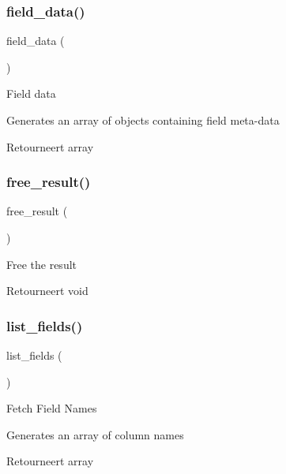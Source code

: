 \subsubsection{\texorpdfstring{field\_data()}{field\_data()}}
{\footnotesize\ttfamily field\+\_\+data (\begin{DoxyParamCaption}{ }\end{DoxyParamCaption})}

Field data

Generates an array of objects containing field meta-\/data

\begin{DoxyReturn}{Retourneert}
array 
\end{DoxyReturn}
\mbox{\label{class_c_i___d_b__sqlsrv__result_aad2d98d6beb3d6095405356c6107b473}} 
\subsubsection{\texorpdfstring{free\_result()}{free\_result()}}
{\footnotesize\ttfamily free\+\_\+result (\begin{DoxyParamCaption}{ }\end{DoxyParamCaption})}

Free the result

\begin{DoxyReturn}{Retourneert}
void 
\end{DoxyReturn}
\mbox{\label{class_c_i___d_b__sqlsrv__result_a50b54eb4ea7cfd039740f532988ea776}} 
\subsubsection{\texorpdfstring{list\_fields()}{list\_fields()}}
{\footnotesize\ttfamily list\+\_\+fields (\begin{DoxyParamCaption}{ }\end{DoxyParamCaption})}

Fetch Field Names

Generates an array of column names

\begin{DoxyReturn}{Retourneert}
array 
\end{DoxyReturn}
\mbox{\label{class_c_i___d_b__sqlsrv__result_af831bf363e4d7d661a717a4932af449d}} 
